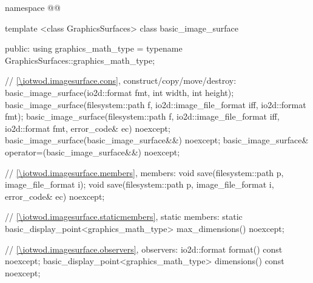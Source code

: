 \begin{codeblock}
namespace @\fullnamespace{}@ {
  template <class GraphicsSurfaces>
  class basic_image_surface {
  public:
    using graphics_math_type = typename GraphicsSurfaces::graphics_math_type;

    // \ref{\iotwod.imagesurface.cons}, construct/copy/move/destroy:
    basic_image_surface(io2d::format fmt, int width, int height);
    basic_image_surface(filesystem::path f, io2d::image_file_format iff, io2d::format fmt);
    basic_image_surface(filesystem::path f, io2d::image_file_format iff, io2d::format fmt,
      error_code& ec) noexcept;
    basic_image_surface(basic_image_surface&&) noexcept;
    basic_image_surface& operator=(basic_image_surface&&) noexcept;

    // \ref{\iotwod.imagesurface.members}, members:
    void save(filesystem::path p, image_file_format i);
    void save(filesystem::path p, image_file_format i, error_code& ec) noexcept;

    // \ref{\iotwod.imagesurface.staticmembers}, static members:
    static basic_display_point<graphics_math_type> max_dimensions() noexcept;

    // \ref{\iotwod.imagesurface.observers}, observers:
    io2d::format format() const noexcept;
    basic_display_point<graphics_math_type> dimensions() const noexcept;
	
}}
\end{codeblock}
